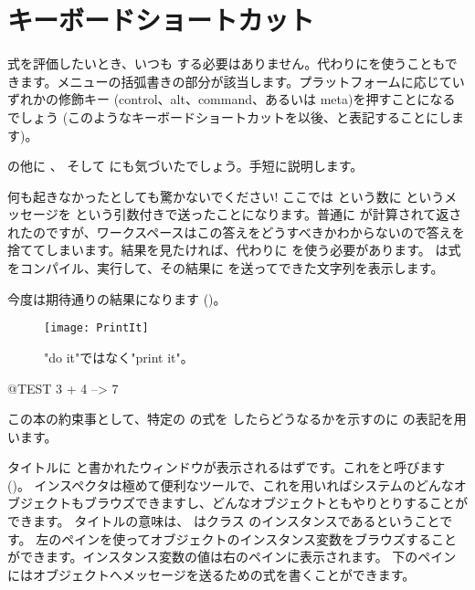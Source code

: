 \documentclass[a4paper,10pt,twoside]{book}
\begin{document}
\section{キーボードショートカット}

式を評価したいとき、いつも \actclick する必要はありません。代わりにを使うこともできます。メニューの括弧書きの部分が該当します。プラットフォームに応じていずれかの修飾キー (control、alt、command、あるいは meta)を押すことになるでしょう
(このようなキーボードショートカットを以後、と表記することにします)。


 の他に 、 そして  にも気づいたでしょう。手短に説明します。


何も起きなかったとしても驚かないでください! ここでは  という数に \ct{+} というメッセージを  という引数付きで送ったことになります。普通に  が計算されて返されたのですが、ワークスペースはこの答えをどうすべきかわからないので答えを捨ててしまいます。結果を見たければ、代わりに  を使う必要があります。 は式をコンパイル、実行して、その結果に  を送ってできた文字列を表示します。

今度は期待通りの結果になります ()。

\begin{figure}[htb]
\centerline {\texttt{[image: PrintIt]}}
\caption{"do it"ではなく"print it"。}
\end{figure}

\begin{code}{@TEST}
3 + 4 --> 7
\end{code}
\noindent
この本の約束事として、特定の \pharo の式を  したらどうなるかを示すのに \ct{-->} の表記を用います。

\noindent
タイトルに  と書かれたウィンドウが表示されるはずです。これをと呼びます ()。
インスペクタは極めて便利なツールで、これを用いればシステムのどんなオブジェクトもブラウズできますし、どんなオブジェクトともやりとりすることができます。
タイトルの意味は、 はクラス  のインスタンスであるということです。
左のペインを使ってオブジェクトのインスタンス変数をブラウズすることができます。インスタンス変数の値は右のペインに表示されます。
下のペインにはオブジェクトへメッセージを送るための式を書くことができます。
\end{document}
